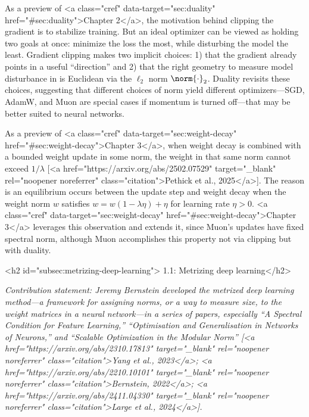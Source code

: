 \begin{notebox}
    As a preview of <a class="cref" data-target="sec:duality" href="#sec:duality">Chapter 2</a>, the motivation behind clipping the gradient is to stabilize training. But an ideal optimizer can be viewed as holding two goals at once: minimize the loss the most, while disturbing the model the least. Gradient clipping makes two implicit choices: 1) that the gradient already points in a useful “direction” and 2) that the right geometry to measure model disturbance in is Euclidean via the $\ell_2$ norm $\norm{\cdot}_2$. Duality revisits these choices, suggesting that different choices of norm yield different optimizers---SGD, AdamW, and Muon are special cases if momentum is turned off---that may be better suited to neural networks.
\end{notebox}

\begin{notebox}
    As a preview of <a class="cref" data-target="sec:weight-decay" href="#sec:weight-decay">Chapter 3</a>, when weight decay is combined with a bounded weight update in some norm, the weight in that same norm cannot exceed $1/\lambda$ [<a href="https://arxiv.org/abs/2502.07529" target="_blank" rel="noopener noreferrer" class="citation">Pethick et al., 2025</a>]. The reason is an equilibrium occurs between the update step and weight decay when the weight norm $w$ satisfies $w = w(1 - \lambda \eta) + \eta$ for learning rate $\eta > 0$. <a class="cref" data-target="sec:weight-decay" href="#sec:weight-decay">Chapter 3</a> leverages this observation and extends it, since Muon's updates have fixed spectral norm, although Muon accomplishes this property not via clipping but with duality.
\end{notebox}









<h2 id="subsec:metrizing-deep-learning"> 1.1: Metrizing deep learning</h2>

\textit{Contribution statement: Jeremy Bernstein developed the metrized deep learning method---a framework for assigning norms, or a way to measure size, to the weight matrices in a neural network---in a series of papers, especially “A Spectral Condition for Feature Learning,” “Optimisation and Generalisation in Networks of Neurons,” and “Scalable Optimization in the Modular Norm” [<a href="https://arxiv.org/abs/2310.17813" target="_blank" rel="noopener noreferrer" class="citation">Yang et al., 2023</a>; <a href="https://arxiv.org/abs/2210.10101" target="_blank" rel="noopener noreferrer" class="citation">Bernstein, 2022</a>; <a href="https://arxiv.org/abs/2411.04330" target="_blank" rel="noopener noreferrer" class="citation">Large et al., 2024</a>].}

